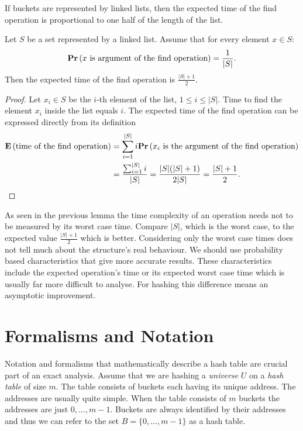 If buckets are represented by linked lists, then the expected time of the find operation is proportional to one half of the length of the list.
\begin{lemma}
\label{lemma-expected-list-time}
Let $S$ be a set represented by a linked list. Assume that for every element $x \in S$: \[ \mathbf{Pr}\left(x \text{ is argument of the find operation}\right) = \frac{1}{|S|} \text{.} \] Then the expected time of the find operation is $\frac{|S| + 1}{2}$.
\end{lemma}
\begin{proof}
Let $x_i \in S$ be the $i$-th element of the list, $1 \leq i \leq |S|$. Time to find the element $x_i$ inside the list equals $i$. The expected time of the find operation can be expressed directly from its definition
\[
\begin{split}
\mathbf{E}\left(\text{time of the find operation}\right) 
	& = \displaystyle\sum_{i = 1}^{|S|} i \mathbf{Pr}\left(x_i \text{ is the argument of the find operation}\right) \\
	& = \frac{\sum_{i = 1}^{|S|}{i}}{|S|} = \frac{|S|(|S| + 1)}{2 |S|} = \frac{|S| + 1}{2} \text{.}
\end{split}
\]
\end{proof}

As seen in the previous lemma the time complexity of an operation needs not to be measured by its worst case time. Compare $|S|$, which is the worst case, to the expected value $\frac{|S| + 1}{2}$ which is better. Considering only the worst case times does not tell much about the structure's real behaviour. We should use probability based characteristics that give more accurate results. These characteristics include the expected operation's time or its expected worst case time which is usually far more difficult to analyse. For hashing this difference means an asymptotic improvement.

\section{Formalisms and Notation}
\label{section-notation}
Notation and formalisms that mathematically describe a hash table are crucial part of an exact analysis. Assume that we are hashing a \emph{universe} $U$ on a \emph{hash table} of size $m$. The table consists of buckets each having its unique address. The addresses are usually quite simple. When the table consists of $m$ buckets the addresses are just $0, \dots, m - 1$. Buckets are always identified by their addresses and thus we can refer to the set $B = \{0, \dots, m - 1\}$ as a hash table.

